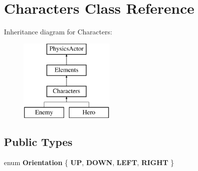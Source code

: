 \hypertarget{class_characters}{\section{Characters Class Reference}
\label{class_characters}
}
Inheritance diagram for Characters\+:\begin{figure}[H]
\begin{center}
\leavevmode
\includegraphics[height=4.000000cm]{class_characters}
\end{center}
\end{figure}
\subsection*{Public Types}
\begin{DoxyCompactItemize}
\item 
\hypertarget{class_characters_a95d5115bd36cdc1a7a21ab8c679f7524}{enum {\bfseries Orientation} \{ {\bfseries U\+P}, 
{\bfseries D\+O\+W\+N}, 
{\bfseries L\+E\+F\+T}, 
{\bfseries R\+I\+G\+H\+T}
 \}}\label{class_characters_a95d5115bd36cdc1a7a21ab8c679f7524}

\end{DoxyCompactItemize}
